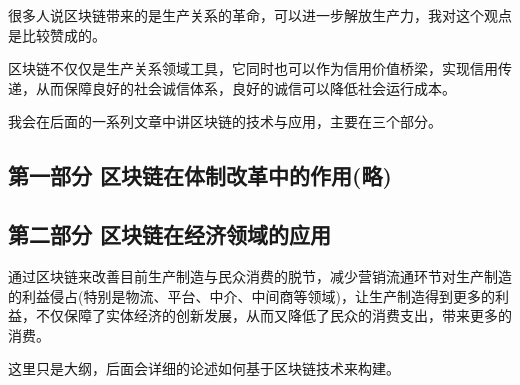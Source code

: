 \documentclass[UTF9]{ctexart}
\begin{document}
很多人说区块链带来的是生产关系的革命，可以进一步解放生产力，我对这个观点是比较赞成的。

区块链不仅仅是生产关系领域工具，它同时也可以作为信用价值桥梁，实现信用传递，从而保障良好的社会诚信体系，良好的诚信可以降低社会运行成本。

我会在后面的一系列文章中讲区块链的技术与应用，主要在三个部分。

\subsection{第一部分 区块链在体制改革中的作用(略)}

\subsection{第二部分 区块链在经济领域的应用}

通过区块链来改善目前生产制造与民众消费的脱节，减少营销流通环节对生产制造的利益侵占(特别是物流、平台、中介、中间商等领域)，让生产制造得到更多的利益，不仅保障了实体经济的创新发展，从而又降低了民众的消费支出，带来更多的消费。

这里只是大纲，后面会详细的论述如何基于区块链技术来构建。
\end{document}
